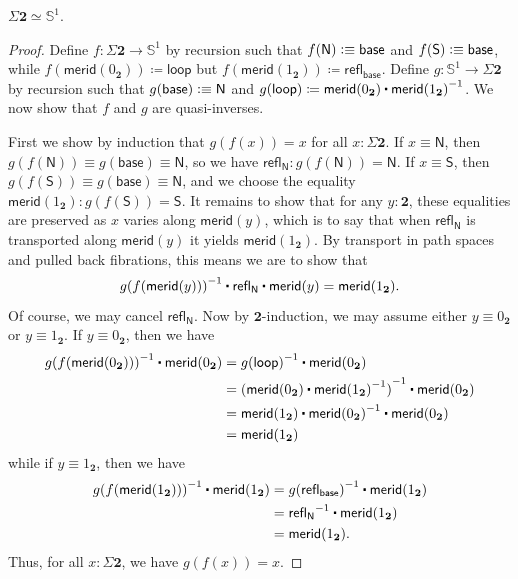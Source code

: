 \documentclass[10pt,a4paper]{article}
\providecommand{\index}[1]{}
\newcommand{\jdeq}{\equiv}      %
\newcommand{\defeq}{\vcentcolon\equiv}  %
\newcommand{\defid}{\coloneqq}
\newcommand{\refl}[1]{\ensuremath{\mathsf{refl}_{#1}}\xspace}
\newcommand{\ct}{%
  \mathchoice{\mathbin{\raisebox{0.5ex}{$\displaystyle\centerdot$}}}%
             {\mathbin{\raisebox{0.5ex}{$\centerdot$}}}%
             {\mathbin{\raisebox{0.25ex}{$\scriptstyle\,\centerdot\,$}}}%
             {\mathbin{\raisebox{0.1ex}{$\scriptscriptstyle\,\centerdot\,$}}}
}
\newcommand{\opp}[1]{\mathord{{#1}^{-1}}}
\newcommand{\map}[2]{\ensuremath{{#1}\mathopen{}\left({#2}\right)\mathclose{}}\xspace}
\let\ap\map
\newcommand{\eqv}[2]{\ensuremath{#1 \simeq #2}\xspace}
\newcommand{\bool}{\ensuremath{\mathbf{2}}\xspace}
\newcommand{\btrue}{{1_{\bool}}}
\newcommand{\bfalse}{{0_{\bool}}}
\newcommand{\Sn}{\mathbb{S}}
\newcommand{\base}{\ensuremath{\mathsf{base}}\xspace}
\newcommand{\lloop}{\ensuremath{\mathsf{loop}}\xspace}
\newcommand{\susp}{\Sigma}
\newcommand{\north}{\mathsf{N}}
\newcommand{\south}{\mathsf{S}}
\newcommand{\merid}{\mathsf{merid}}
\theoremstyle{definition}
\theoremstyle{remark}
\numberwithin{equation}{section}
\begin{document}
\begin{lem}\label{thm:suspbool}
  \index{type!circle}%
  $\eqv{\susp\bool}{\Sn^1}$.
\end{lem}

\begin{proof}
  Define $f:\susp\bool\to\Sn^1$ by recursion such that $f(\north)\defeq \base$ and $f(\south)\defeq\base$, while $\ap f{\merid(\bfalse)}\defid\lloop$ but $\ap f{\merid(\btrue)} \defid \refl{\base}$.
  Define $g:\Sn^1\to\susp\bool$ by recursion such that $g(\base)\defeq \north$ and $\ap g \lloop \defid \merid(\bfalse) \ct \opp{\merid(\btrue)}$.
  We now show that $f$ and $g$ are quasi-inverses.

  First we show by induction that $g(f(x))=x$ for all $x:\susp \bool$.
  If $x\jdeq\north$, then $g(f(\north)) \jdeq g(\base)\jdeq \north$, so we have $\refl{\north} : g(f(\north))=\north$.
  If $x\jdeq\south$, then $g(f(\south)) \jdeq g(\base)\jdeq \north$, and we choose the equality $\merid(\btrue) : g(f(\south)) = \south$.
  It remains to show that for any $y:\bool$, these equalities are preserved as $x$ varies along $\merid(y)$, which is to say that when $\refl{\north}$ is transported along $\merid(y)$ it yields $\merid(\btrue)$.
  By transport in path spaces and pulled back fibrations, this means we are to show that
  \[ \opp{\ap g {\ap f {\merid(y)}}} \ct \refl{\north} \ct \merid(y) = \merid(\btrue). \]
  Of course, we may cancel $\refl{\north}$.
  Now by \bool-induction, we may assume either $y\jdeq \bfalse$ or $y\jdeq \btrue$.
  If $y\jdeq \bfalse$, then we have
  \begin{align*}
    \opp{\ap g {\ap f {\merid(\bfalse)}}} \ct \merid(\bfalse)
    &= \opp{\ap g {\lloop}} \ct \merid(\bfalse)\\
    &= \opp{(\merid(\bfalse) \ct \opp{\merid(\btrue)})} \ct \merid(\bfalse)\\
    &= \merid(\btrue) \ct \opp{\merid(\bfalse)} \ct \merid(\bfalse)\\
    &= \merid(\btrue)
  \end{align*}
  while if $y\jdeq \btrue$, then we have
  \begin{align*}
    \opp{\ap g {\ap f {\merid(\btrue)}}} \ct \merid(\btrue)
    &= \opp{\ap g {\refl{\base}}} \ct \merid(\btrue)\\
    &= \opp{\refl{\north}} \ct \merid(\btrue)\\
    &= \merid(\btrue).
  \end{align*}
  Thus, for all $x:\susp \bool$, we have $g(f(x))=x$.


\end{proof}
\end{document}
